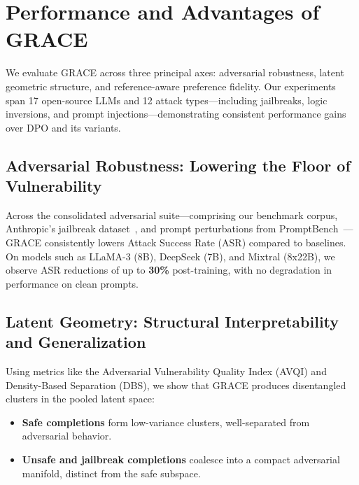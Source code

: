 



\section{Performance and Advantages of \textsc{GRACE}}

We evaluate \textsc{GRACE} across three principal axes: adversarial robustness, latent geometric structure, and reference-aware preference fidelity. Our experiments span 17 open-source LLMs and 12 attack types—including jailbreaks, logic inversions, and prompt injections—demonstrating consistent performance gains over DPO and its variants.

\vspace{1mm}
\subsection*{Adversarial Robustness: Lowering the Floor of Vulnerability}

Across the consolidated adversarial suite—comprising our benchmark corpus, Anthropic’s jailbreak dataset~\cite{perez2022red}, and prompt perturbations from PromptBench~\cite{zhu2024promptbench}—\textsc{GRACE} consistently lowers Attack Success Rate (ASR) compared to baselines. On models such as LLaMA-3 (8B), DeepSeek (7B), and Mixtral (8x22B), we observe ASR reductions of up to \textbf{30\%} post-training, with no degradation in performance on clean prompts.

\vspace{1mm}
\subsection*{Latent Geometry: Structural Interpretability and Generalization}

Using metrics like the Adversarial Vulnerability Quality Index (AVQI) and Density-Based Separation (DBS), we show that \textsc{GRACE} produces disentangled clusters in the pooled latent space:
\begin{itemize}[leftmargin=1.5em]
    \item \textbf{Safe completions} form low-variance clusters, well-separated from adversarial behavior.
    \item \textbf{Unsafe and jailbreak completions} coalesce into a compact adversarial manifold, distinct from the safe subspace.
\end{itemize}




